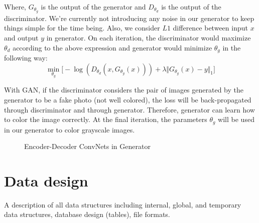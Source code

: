 \documentclass[oneside,a4paper,12pt]{report}
\begin{document}
\begin{table}[!htbp]
	Where, $G_{\theta_{g}}$ is the output of the generator and $D_{\theta_d}$ is the output of the discriminator.
	We're currently not introducing any noise in our generator to keep things simple for the time being. Also, we consider $L1$ difference between input $x$ and output $y$ in generator. On each iteration, the discriminator would maximize $\theta_d$ according to the above expression and generator would minimize $\theta_g$ in the following way:
	\[
		\min_{\theta_g}\Big[-\log(D_{\theta_d}(x,G_{\theta_g}(x)))+\lambda \Vert G_{\theta_g}(x) - y \Vert_1 \Big]
	\]

	With GAN, if the discriminator considers the pair of images generated by the generator to be a fake photo (not well colored), the loss will be back-propagated through discriminator and through generator. Therefore, generator can learn how to color the image correctly. At the final iteration, the parameters $\theta_g$ will be used in our generator to color grayscale images.

  \begin{center}
	\begin{figure}[!htbp]
		\centering
	  \caption{Encoder-Decoder ConvNets in Generator}
	  \label{fig:gen_color-dig}
	\end{figure}
\end{center}


\section{Data design }
A description of all data structures including internal, global, and temporary data structures, database design (tables), file formats.

\end{table}
\end{document}
